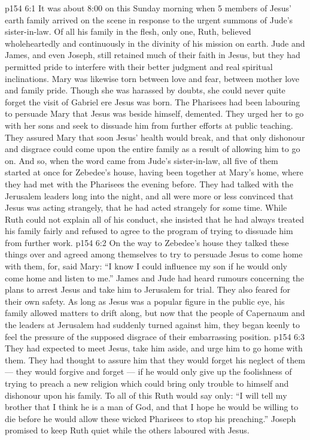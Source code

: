 \vs p154 6:1 It was about 8:00 on this Sunday morning when 5 members of Jesus’ earth family arrived on the scene in response to the urgent summons of Jude’s sister\hyp{}in\hyp{}law. Of all his family in the flesh, only one, Ruth, believed wholeheartedly and continuously in the divinity of his mission on earth. Jude and James, and even Joseph, still retained much of their faith in Jesus, but they had permitted pride to interfere with their better judgment and real spiritual inclinations. Mary was likewise torn between love and fear, between mother love and family pride. Though she was harassed by doubts, she could never quite forget the visit of Gabriel ere Jesus was born. The Pharisees had been labouring to persuade Mary that Jesus was beside himself, demented. They urged her to go with her sons and seek to dissuade him from further efforts at public teaching. They assured Mary that soon Jesus’ health would break, and that only dishonour and disgrace could come upon the entire family as a result of allowing him to go on. And so, when the word came from Jude’s sister\hyp{}in\hyp{}law, all five of them started at once for Zebedee’s house, having been together at Mary’s home, where they had met with the Pharisees the evening before. They had talked with the Jerusalem leaders long into the night, and all were more or less convinced that Jesus was acting strangely, that he had acted strangely for some time. While Ruth could not explain all of his conduct, she insisted that he had always treated his family fairly and refused to agree to the program of trying to dissuade him from further work.
\vs p154 6:2 On the way to Zebedee’s house they talked these things over and agreed among themselves to try to persuade Jesus to come home with them, for, said Mary: “I know I could influence my son if he would only come home and listen to me.” James and Jude had heard rumours concerning the plans to arrest Jesus and take him to Jerusalem for trial. They also feared for their own safety. As long as Jesus was a popular figure in the public eye, his family allowed matters to drift along, but now that the people of Capernaum and the leaders at Jerusalem had suddenly turned against him, they began keenly to feel the pressure of the supposed disgrace of their embarrassing position.
\vs p154 6:3 They had expected to meet Jesus, take him aside, and urge him to go home with them. They had thought to assure him that they would forget his neglect of them --- they would forgive and forget --- if he would only give up the foolishness of trying to preach a new religion which could bring only trouble to himself and dishonour upon his family. To all of this Ruth would say only: “I will tell my brother that I think he is a man of God, and that I hope he would be willing to die before he would allow these wicked Pharisees to stop his preaching.” Joseph promised to keep Ruth quiet while the others laboured with Jesus.
